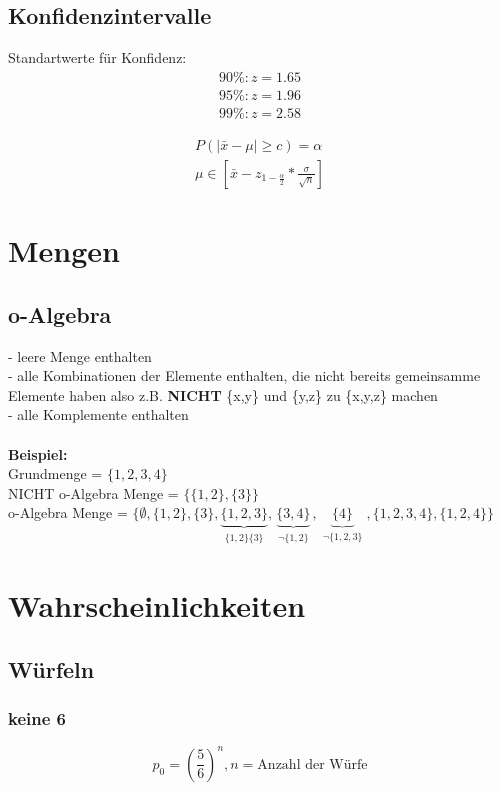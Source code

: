 \documentclass{article}
\begin{document}
\subsection{Konfidenzintervalle}
Standartwerte f\"ur Konfidenz:
\begin{align*}
	90\%:z = 1.65\\
	95\%:z = 1.96\\
	99\%:z = 2.58
\end{align*}

\begin{align}
	P(|\bar{x}-\mu| \geq c) = \alpha \\
	\mu \in [\bar{x} - z_{1-\frac{\alpha}{2}} * \frac{\sigma}{\sqrt{n}}]
\end{align}

\section{Mengen}
\subsection{o-Algebra}
- leere Menge enthalten\\
- alle Kombinationen der Elemente enthalten, die nicht bereits gemeinsamme Elemente haben also z.B. \textbf{NICHT} \{x,y\} und \{y,z\} zu \{x,y,z\} machen\\
- alle Komplemente enthalten\\ \\
\textbf{Beispiel:}\\
Grundmenge = $\{1,2,3,4\}$\\
NICHT o-Algebra Menge = $\{\{1,2\},\{3\}\}$\\
o-Algebra Menge = $\{\emptyset ,\{1,2\},\{3\},
	\underbrace{\{1,2,3\}}_{\substack{\{1,2\}\{3\}}},
	\underbrace{\{3,4\}}_{\substack{\neg \{1,2\}}},
	\underbrace{\{4\}}_{\substack{\neg \{1,2,3\}}},
\{1,2,3,4\},\{1,2,4\}\}$

\section{Wahrscheinlichkeiten}
\subsection{W\"urfeln}
\subsubsection{keine 6}
\[
	p_0 = \left( \frac{5}{6} \right)^n , n = \text{Anzahl der W\"urfe}
\]
\end{document}
